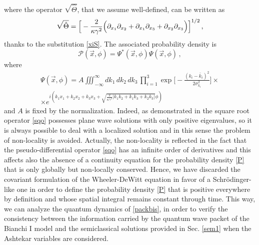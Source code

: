 \documentclass[aps,prd,twocolumn,nofootinbib,superscriptaddress]{revtex4-2}
\begin{document}
where the operator $\sqrt{\hat{\Theta}}$, that we assume well-defined, can be written as
\begin{align}
	\label{sqo}
	\sqrt{\hat{\Theta}}= \Big[-{2\over\kappa\gamma^{2}}\Big( \partial_{x_{1}}\partial_{x_{2}}+\partial_{x_{1}}\partial_{x_{3}}+ \partial_{x_{2}}\partial_{x_{3}}\Big)\Big]^{1/2}\,,
\end{align}
thanks to the substitution \eqref{xiS}. The associated probability density is
\begin{equation}
	\mathcal{P}(\vec x,\phi)=\Psi^{*}(\vec x,\phi)\Psi(\vec x,\phi)\,,
	\label{P}
\end{equation}
where 
\begin{align}
	\Psi(\vec{x},\phi)=A\iiint_{-\infty}^{\infty}dk_1	\,dk_2\,dk_3\,\prod_{i=1}^3\exp\bigg[-{\frac{(k_i-\bar{k}_i)^2}{2\sigma_{k_i}^2}}\bigg]\times\nonumber
	\\ \times  e^{i(k_1x_1+k_2x_2+k_3x_3+\sqrt{\frac{2}{\kappa\gamma^2}|k_1k_2+k_1k_3+k_2k_3|}\phi)}
	\label{packbis} 
\end{align}
and $A$ is fixed by the normalization. Indeed, as demonstrated in \cite{SQO,Puzio} the square root operator \eqref{sqo} possesses plane wave solutions with only positive eigenvalues, so it is always possible to deal with a localized solution and in this sense the problem of non-locality is avoided. Actually, the non-locality is reflected in the fact that the pseudo-differential operator \eqref{sqo} has an infinite order of derivatives and this affects also the absence of a continuity equation for the probability density \eqref{P} that is only globally but non-locally conserved. Hence, we have discarded the covariant formulation of the Wheeler-DeWitt equation in favor of a Schr\"odinger-like one in order to define the probability density \eqref{P} that is positive everywhere by definition and whose spatial integral remains constant through time. This way, we can analyze the quantum dynamics of \eqref{packbis}, in order to verify the consistency between the information carried by the quantum wave packet of the Bianchi I model and the semiclassical solutions provided in Sec. \ref{sem1} when the Ashtekar variables are considered. 
\end{document}

